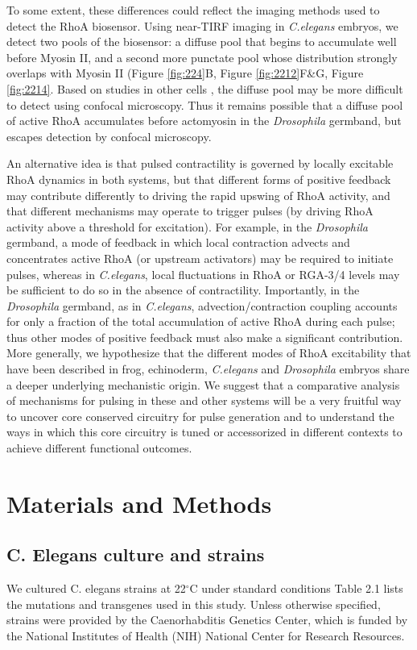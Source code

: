 To some extent, these differences could reflect the imaging methods used to detect the RhoA biosensor.  Using near-TIRF imaging in \textit{C.elegans} embryos, we detect two pools of the biosensor: a diffuse pool that begins to accumulate well before Myosin II, and a second more punctate pool whose distribution strongly overlaps with Myosin II (Figure \ref{fig:224}B, Figure \ref{fig:2212}F\&G, Figure \ref{fig:2214}.  Based on studies in other cells  \cite{Weiner:2007cl}, the diffuse pool may be more difficult to detect using confocal microscopy. Thus it remains possible that a diffuse pool of active RhoA accumulates before actomyosin in the \textit{Drosophila} germband, but escapes detection by confocal microscopy.  

An alternative idea is that pulsed contractility is governed by locally excitable RhoA dynamics in both systems, but that different forms of positive feedback may contribute differently to driving the rapid upswing of RhoA activity, and that different mechanisms may operate to trigger pulses (by driving RhoA activity above a threshold for excitation). For example, in the \textit{Drosophila} germband, a mode of feedback in which local contraction advects and concentrates active RhoA (or upstream activators) may be required to initiate pulses, whereas in \textit{C.elegans}, local fluctuations in RhoA or RGA-3/4 levels may be sufficient to do so in the absence of contractility. Importantly, in the \textit{Drosophila} germband, as in \textit{C.elegans}, advection/contraction coupling accounts for only a fraction of the total accumulation of active RhoA during each pulse; thus other modes of positive feedback must also make a significant contribution. 
More generally, we hypothesize that the different modes of RhoA excitability that have been described in frog, echinoderm, \textit{C.elegans} and \textit{Drosophila} embryos share a deeper underlying mechanistic origin. We suggest that a comparative analysis of mechanisms for pulsing in these and other systems will be a very fruitful way to uncover core conserved circuitry for pulse generation and to understand the ways in which this core circuitry is tuned or accessorized in different contexts to achieve different functional outcomes.  




\section{Materials and Methods}
\subsection{C. Elegans culture and strains}
We cultured C. elegans strains at 22$^{\circ}$C under standard conditions  \cite{Brenner:1974wn} Table 2.1 lists the mutations and transgenes used in this study. Unless otherwise specified, strains were provided by the Caenorhabditis Genetics Center, which is funded by the National Institutes of Health (NIH) National Center for Research Resources.



